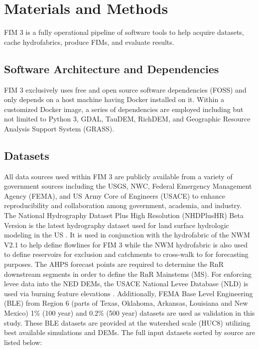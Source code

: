 \section{Materials and Methods}

FIM 3 is a fully operational pipeline of software tools to help acquire datasets, cache hydrofabrics, produce FIMs, and evaluate results.

\subsection{Software Architecture and Dependencies}

FIM 3 exclusively uses free and open source software dependencies (FOSS) and only depends on a host machine having Docker installed on it. 
Within a customized Docker image, a series of dependencies are employed including but not limited to Python 3, GDAL, TauDEM, RichDEM, and Geographic Resource Analysis Support System (GRASS).

\subsection{Datasets}

All data sources used within FIM 3 are publicly available from a variety of government sources including the USGS, NWC, Federal Emergency Management Agency (FEMA), and US Army Core of Engineers (USACE) to enhance reproducibility and collaboration among government, academia, and industry.
The National Hydrography Dataset Plus High Resolution (NHDPlusHR) Beta Version is the latest hydrography dataset used for land surface hydrologic modeling in the US \cite{moore2019user}. 
It is used in conjunction with the hydrofabric of the NWM V2.1 to help define flowlines for FIM 3 while the NWM hydrofabric is also used to define reservoirs for exclusion and catchments to cross-walk to for forecasting purposes.
The AHPS forecast points are required to determine the RnR downstream segments in order to define the RnR Mainstems (MS).
For enforcing levee data into the NED DEMs, the USACE National Levee Database (NLD) is used via burning feature elevations \cite{engineers2016national}.
Additionally, FEMA Base Level Engineering (BLE) from Region 6 (parts of Texas, Oklahoma, Arkansas, Louisiana and New Mexico) 1\% (100 year) and 0.2\% (500 year) datasets are used as validation in this study. 
These BLE datasets are provided at the watershed scale (HUC8) utilizing best available simulations and DEMs.
The full input datasets sorted by source are listed below:

